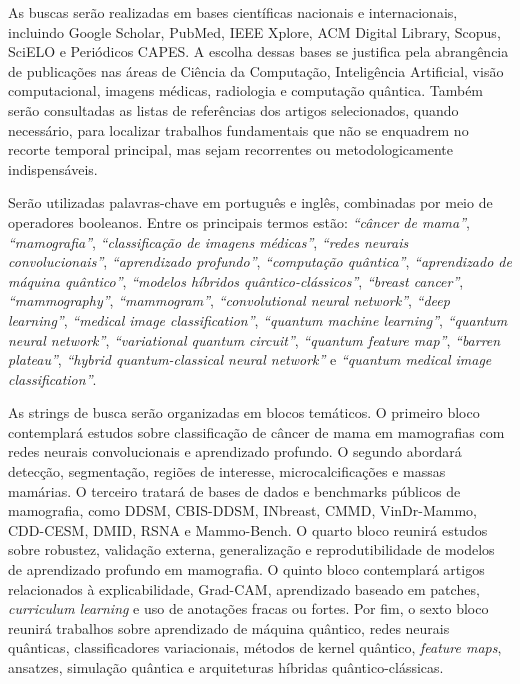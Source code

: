 \documentclass[
    12pt,
    openright,
    oneside,
    a4paper,
    english,
    brazil
]{abntex2}
\begin{document}
As buscas serão realizadas em bases científicas nacionais e internacionais, incluindo Google Scholar, PubMed, IEEE Xplore, ACM Digital Library, Scopus, SciELO e Periódicos CAPES. A escolha dessas bases se justifica pela abrangência de publicações nas áreas de Ciência da Computação, Inteligência Artificial, visão computacional, imagens médicas, radiologia e computação quântica. Também serão consultadas as listas de referências dos artigos selecionados, quando necessário, para localizar trabalhos fundamentais que não se enquadrem no recorte temporal principal, mas sejam recorrentes ou metodologicamente indispensáveis.

Serão utilizadas palavras-chave em português e inglês, combinadas por meio de operadores booleanos. Entre os principais termos estão: \textit{``câncer de mama''}, \textit{``mamografia''}, \textit{``classificação de imagens médicas''}, \textit{``redes neurais convolucionais''}, \textit{``aprendizado profundo''}, \textit{``computação quântica''}, \textit{``aprendizado de máquina quântico''}, \textit{``modelos híbridos quântico-clássicos''}, \textit{``breast cancer''}, \textit{``mammography''}, \textit{``mammogram''}, \textit{``convolutional neural network''}, \textit{``deep learning''}, \textit{``medical image classification''}, \textit{``quantum machine learning''}, \textit{``quantum neural network''}, \textit{``variational quantum circuit''}, \textit{``quantum feature map''}, \textit{``barren plateau''}, \textit{``hybrid quantum-classical neural network''} e \textit{``quantum medical image classification''}.

As strings de busca serão organizadas em blocos temáticos. O primeiro bloco contemplará estudos sobre classificação de câncer de mama em mamografias com redes neurais convolucionais e aprendizado profundo. O segundo abordará detecção, segmentação, regiões de interesse, microcalcificações e massas mamárias. O terceiro tratará de bases de dados e benchmarks públicos de mamografia, como DDSM, CBIS-DDSM, INbreast, CMMD, VinDr-Mammo, CDD-CESM, DMID, RSNA e Mammo-Bench. O quarto bloco reunirá estudos sobre robustez, validação externa, generalização e reprodutibilidade de modelos de aprendizado profundo em mamografia. O quinto bloco contemplará artigos relacionados à explicabilidade, Grad-CAM, aprendizado baseado em patches, \textit{curriculum learning} e uso de anotações fracas ou fortes. Por fim, o sexto bloco reunirá trabalhos sobre aprendizado de máquina quântico, redes neurais quânticas, classificadores variacionais, métodos de kernel quântico, \textit{feature maps}, ansatzes, simulação quântica e arquiteturas híbridas quântico-clássicas.
\end{document}
